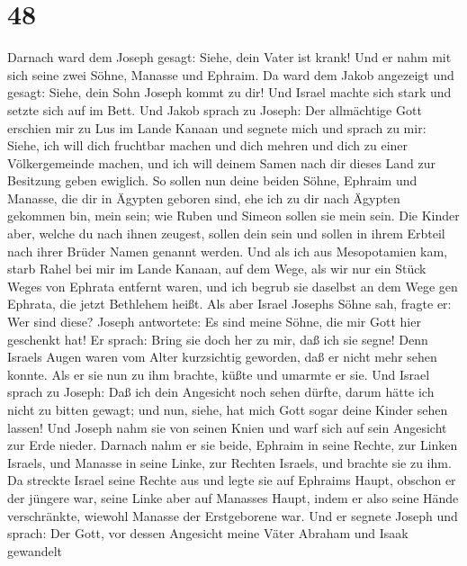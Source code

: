 \hypertarget{section-47}{%
\section{48}\label{section-47}}

 Darnach ward dem Joseph gesagt: Siehe, dein Vater ist
krank! Und er nahm mit sich seine zwei Söhne, Manasse und Ephraim.
 Da ward dem Jakob angezeigt und gesagt: Siehe, dein Sohn
Joseph kommt zu dir! Und Israel machte sich stark und setzte sich auf im
Bett.  Und Jakob sprach zu Joseph: Der allmächtige Gott
erschien mir zu Lus im Lande Kanaan und segnete mich  und
sprach zu mir: Siehe, ich will dich fruchtbar machen und dich mehren und
dich zu einer Völkergemeinde machen, und ich will deinem Samen nach dir
dieses Land zur Besitzung geben ewiglich.  So sollen nun
deine beiden Söhne, Ephraim und Manasse, die dir in Ägypten geboren
sind, ehe ich zu dir nach Ägypten gekommen bin, mein sein; wie Ruben und
Simeon sollen sie mein sein.  Die Kinder aber, welche du
nach ihnen zeugest, sollen dein sein und sollen in ihrem Erbteil nach
ihrer Brüder Namen genannt werden.  Und als ich aus
Mesopotamien kam, starb Rahel bei mir im Lande Kanaan, auf dem Wege, als
wir nur ein Stück Weges von Ephrata entfernt waren, und ich begrub sie
daselbst an dem Wege gen Ephrata, die jetzt Bethlehem heißt.
 Als aber Israel Josephs Söhne sah, fragte er: Wer sind
diese?  Joseph antwortete: Es sind meine Söhne, die mir
Gott hier geschenkt hat! Er sprach: Bring sie doch her zu mir, daß ich
sie segne!  Denn Israels Augen waren vom Alter
kurzsichtig geworden, daß er nicht mehr sehen konnte. Als er sie nun zu
ihm brachte, küßte und umarmte er sie.  Und Israel sprach
zu Joseph: Daß ich dein Angesicht noch sehen dürfte, darum hätte ich
nicht zu bitten gewagt; und nun, siehe, hat mich Gott sogar deine Kinder
sehen lassen!  Und Joseph nahm sie von seinen Knien und
warf sich auf sein Angesicht zur Erde nieder.  Darnach
nahm er sie beide, Ephraim in seine Rechte, zur Linken Israels, und
Manasse in seine Linke, zur Rechten Israels, und brachte sie zu ihm.
 Da streckte Israel seine Rechte aus und legte sie auf
Ephraims Haupt, obschon er der jüngere war, seine Linke aber auf
Manasses Haupt, indem er also seine Hände verschränkte, wiewohl Manasse
der Erstgeborene war.  Und er segnete Joseph und sprach:
Der Gott, vor dessen Angesicht meine Väter Abraham und Isaak gewandelt
